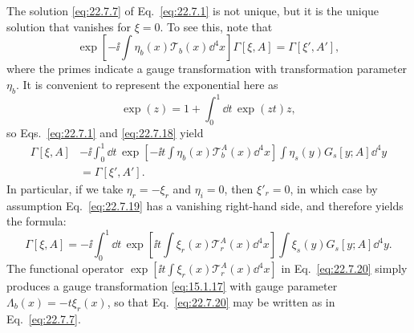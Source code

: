 The solution \eqref{eq:22.7.7} of Eq.~\eqref{eq:22.7.1} is not unique,
but it is the unique solution that vanishes for $\xi=0$. To see this,
note that
\begin{equation}
 \exp\left[-\ii\int\eta_b(x)\mathcal T_b(x)\dd^4x\right]
 \Gamma[\xi,A]
 =\Gamma[\xi',A'],
 \tag{22.7.18}\label{eq:22.7.18}
\end{equation}
where the primes indicate a gauge transformation with transformation
parameter $\eta_b$. It is convenient to represent the exponential
here as
\[
 \exp(z)=1+\int_0^1\dd t\,\exp(zt)z,
\]
so Eqs.~\eqref{eq:22.7.1} and \eqref{eq:22.7.18} yield
\begin{equation}
 \begin{aligned}
 \Gamma[\xi,A]
 &-\ii\int_0^1\dd t\,
 \exp\left[-\ii t\int\eta_b(x)\mathcal T_b^A(x)\dd^4x\right]
 \int\eta_s(y)G_s[y;A]\dd^4y
 \\
 &=\Gamma[\xi',A'].
 \end{aligned}
 \tag{22.7.19}\label{eq:22.7.19}
\end{equation}
In particular, if we take $\eta_r=-\xi_r$ and $\eta_i=0$, then
$\xi'_r=0$, in which case by assumption Eq.~\eqref{eq:22.7.19} has a
vanishing right-hand side, and therefore yields the formula:
\begin{equation}
 \Gamma[\xi,A]
 =-\ii\int_0^1\dd t\,
 \exp\left[\ii t\int\xi_r(x)\mathcal T_r^A(x)\dd^4x\right]
 \int\xi_s(y)G_s[y;A]\dd^4y.
 \tag{22.7.20}\label{eq:22.7.20}
\end{equation}
The functional operator
$\exp[\ii t\int\xi_r(x)\mathcal T_r^A(x)\dd^4x]$ in
Eq.~\eqref{eq:22.7.20} simply produces a gauge transformation
\eqref{eq:15.1.17} with gauge parameter
$\Lambda_b(x)=-t\xi_r(x)$, so that Eq.~\eqref{eq:22.7.20} may be
written as in Eq.~\eqref{eq:22.7.7}.

